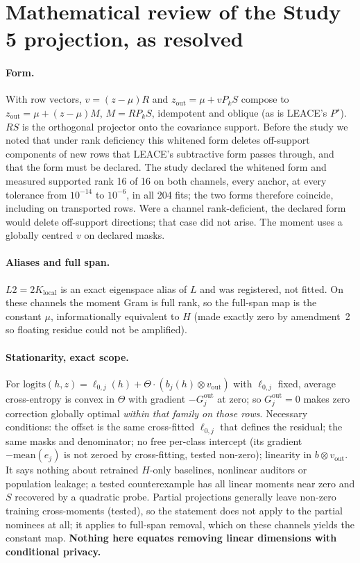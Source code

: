 \documentclass[10pt]{article}
\begin{document}
\section{Mathematical review of the Study 5 projection, as resolved}
\label{app:mathv5}
\paragraph{Form.} With row vectors, $v=(z-\mu)R$ and $z_{\mathrm{out}}=\mu+vP_kS$ compose to
$z_{\mathrm{out}}=\mu+(z-\mu)M$, $M=RP_kS$, idempotent and oblique (as is LEACE's $P^\star$). $RS$ is the
orthogonal projector onto the covariance support. Before the study we noted that under rank deficiency this
whitened form deletes off-support components of new rows that LEACE's subtractive form passes through, and
that the form must be declared. The study declared the whitened form and measured supported rank 16 of 16 on
both channels, every anchor, at every tolerance from $10^{-14}$ to $10^{-6}$, in all 204 fits; the two forms
therefore coincide, including on transported rows. Were a channel rank-deficient, the declared form would delete
off-support directions; that case did not arise. The moment uses a globally centred $v$ on declared masks.
\paragraph{Aliases and full span.} $L2=2K_{\mathrm{local}}$ is an exact eigenspace alias of $L$ and was registered,
not fitted. On these channels the moment Gram is full rank, so the full-span map is the constant $\mu$,
informationally equivalent to $H$ (made exactly zero by amendment~2 so floating residue could not be amplified).
\paragraph{Stationarity, exact scope.} For $\mathrm{logits}(h,z)=\ell_{0,j}(h)+\Theta\cdot(b_j(h)\otimes v_{\mathrm{out}})$
with $\ell_{0,j}$ fixed, average cross-entropy is convex in $\Theta$ with gradient $-G_j^{\mathrm{out}}$ at zero; so
$G_j^{\mathrm{out}}=0$ makes zero correction globally optimal \emph{within that family on those rows}. Necessary
conditions: the offset is the same cross-fitted $\ell_{0,j}$ that defines the residual; the same masks and
denominator; no free per-class intercept (its gradient $-\mathrm{mean}(e_j)$ is not zeroed by cross-fitting, tested
non-zero); linearity in $b\otimes v_{\mathrm{out}}$. It says nothing about retrained $H$-only baselines, nonlinear
auditors or population leakage; a tested counterexample has all linear moments near zero and $S$ recovered by a
quadratic probe. Partial projections generally leave non-zero training cross-moments (tested), so the statement
does not apply to the partial nominees at all; it applies to full-span removal, which on these channels yields the
constant map. \textbf{Nothing here
equates removing linear dimensions with conditional privacy.}
\end{document}
